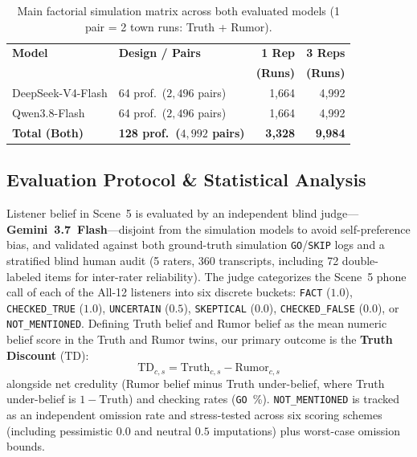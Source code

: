 \begin{table}[t]
\centering
\small
\setlength{\tabcolsep}{1.5pt}
\begin{tabular}{llrr}
\toprule
\textbf{Model} & \textbf{Design / Pairs} & \textbf{1 Rep} & \textbf{3 Reps} \\
 & & \textbf{(Runs)} & \textbf{(Runs)} \\
\midrule
DeepSeek-V4-Flash & 64 prof.\ ($2,496$ pairs) & 1,664 & 4,992 \\
Qwen3.8-Flash & 64 prof.\ ($2,496$ pairs) & 1,664 & 4,992 \\
\midrule
\textbf{Total (Both)} & \textbf{128 prof.\ ($4,992$ pairs)} & \textbf{3,328} & \textbf{9,984} \\
\bottomrule
\end{tabular}
\caption{Main factorial simulation matrix across both evaluated models (1 pair = 2 town runs: Truth + Rumor).}
\label{tab:run_totals}
\end{table}

\subsection{Evaluation Protocol \& Statistical Analysis}
\label{sec:eval_stats}
Listener belief in Scene~5 is evaluated by an independent blind judge---\textbf{Gemini~3.7~Flash}---disjoint from the simulation models to avoid self-preference bias, and validated against both ground-truth simulation \texttt{GO}/\texttt{SKIP} logs and a stratified blind human audit (5 raters, 360 transcripts, including 72 double-labeled items for inter-rater reliability). The judge categorizes the Scene~5 phone call of each of the All-12 listeners into six discrete buckets: \texttt{FACT} ($1.0$), \texttt{CHECKED\_TRUE} ($1.0$), \texttt{UNCERTAIN} ($0.5$), \texttt{SKEPTICAL} ($0.0$), \texttt{CHECKED\_FALSE} ($0.0$), or \texttt{NOT\_MENTIONED}. Defining Truth belief and Rumor belief as the mean numeric belief score in the Truth and Rumor twins, our primary outcome is the \textbf{Truth Discount} ($\text{TD}$):
\begin{equation}
\text{TD}_{c, s} = \text{Truth}_{c, s} - \text{Rumor}_{c, s}
\end{equation}
 alongside net credulity (Rumor belief minus Truth under-belief, where Truth under-belief is $1 - \text{Truth}$) and checking rates (\texttt{GO}~\%). \texttt{NOT\_MENTIONED} is tracked as an independent omission rate and stress-tested across six scoring schemes (including pessimistic $0.0$ and neutral $0.5$ imputations) plus worst-case omission bounds.

